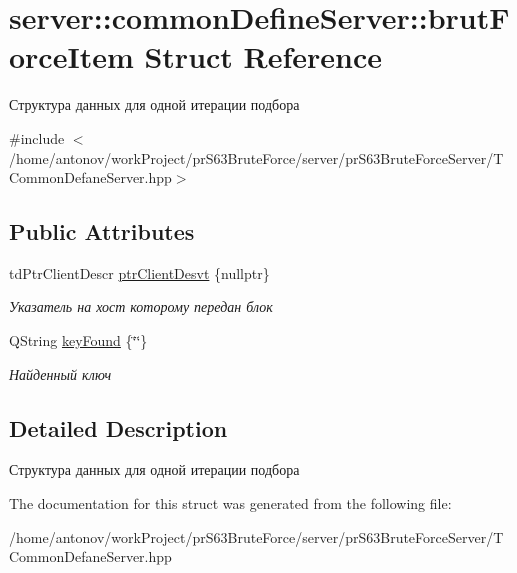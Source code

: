 \hypertarget{structserver_1_1common_define_server_1_1brut_force_item}{}\section{server\+:\+:common\+Define\+Server\+:\+:brut\+Force\+Item Struct Reference}
\label{structserver_1_1common_define_server_1_1brut_force_item}


Структура данных для одной итерации подбора  




{\ttfamily \#include $<$/home/antonov/work\+Project/pr\+S63\+Brute\+Force/server/pr\+S63\+Brute\+Force\+Server/\+T\+Common\+Defane\+Server.\+hpp$>$}

\subsection*{Public Attributes}
\begin{DoxyCompactItemize}
\item 
\mbox{\label{structserver_1_1common_define_server_1_1brut_force_item_a222a59808a5feff51edce49deaa711aa}} 
td\+Ptr\+Client\+Descr \hyperlink{structserver_1_1common_define_server_1_1brut_force_item_a222a59808a5feff51edce49deaa711aa}{ptr\+Client\+Desvt} \{nullptr\}
\begin{DoxyCompactList}\small\item\em Указатель на хост которому передан блок \end{DoxyCompactList}\item 
\mbox{\label{structserver_1_1common_define_server_1_1brut_force_item_a3a446073ee520df43f292bab63d19399}} 
Q\+String \hyperlink{structserver_1_1common_define_server_1_1brut_force_item_a3a446073ee520df43f292bab63d19399}{key\+Found} \{\char`\"{}\char`\"{}\}
\begin{DoxyCompactList}\small\item\em Найденный ключ \end{DoxyCompactList}\end{DoxyCompactItemize}


\subsection{Detailed Description}
Структура данных для одной итерации подбора 

The documentation for this struct was generated from the following file\+:\begin{DoxyCompactItemize}
\item 
/home/antonov/work\+Project/pr\+S63\+Brute\+Force/server/pr\+S63\+Brute\+Force\+Server/T\+Common\+Defane\+Server.\+hpp\end{DoxyCompactItemize}
